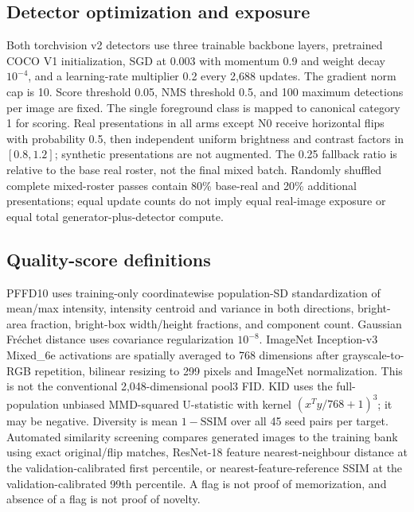 \subsection{Detector optimization and exposure}
Both torchvision v2 detectors use three trainable backbone layers, pretrained COCO V1 initialization, SGD at 0.003 with momentum 0.9 and weight decay $10^{-4}$, and a learning-rate multiplier 0.2 every 2,688 updates. The gradient norm cap is 10. Score threshold 0.05, NMS threshold 0.5, and 100 maximum detections per image are fixed. The single foreground class is mapped to canonical category 1 for scoring. Real presentations in all arms except N0 receive horizontal flips with probability 0.5, then independent uniform brightness and contrast factors in $[0.8,1.2]$; synthetic presentations are not augmented. The 0.25 fallback ratio is relative to the base real roster, not the final mixed batch. Randomly shuffled complete mixed-roster passes contain 80\% base-real and 20\% additional presentations; equal update counts do not imply equal real-image exposure or equal total generator-plus-detector compute.

\subsection{Quality-score definitions}
PFFD10 uses training-only coordinatewise population-SD standardization of mean/max intensity, intensity centroid and variance in both directions, bright-area fraction, bright-box width/height fractions, and component count. Gaussian Fr\'echet distance uses covariance regularization $10^{-8}$. ImageNet Inception-v3 Mixed\_6e activations are spatially averaged to 768 dimensions after grayscale-to-RGB repetition, bilinear resizing to 299 pixels and ImageNet normalization. This is not the conventional 2,048-dimensional pool3 FID. KID uses the full-population unbiased MMD-squared U-statistic with kernel $(x^Ty/768+1)^3$; it may be negative. Diversity is mean $1-\mathrm{SSIM}$ over all 45 seed pairs per target. Automated similarity screening compares generated images to the training bank using exact original/flip matches, ResNet-18 feature nearest-neighbour distance at the validation-calibrated first percentile, or nearest-feature-reference SSIM at the validation-calibrated 99th percentile. A flag is not proof of memorization, and absence of a flag is not proof of novelty.
